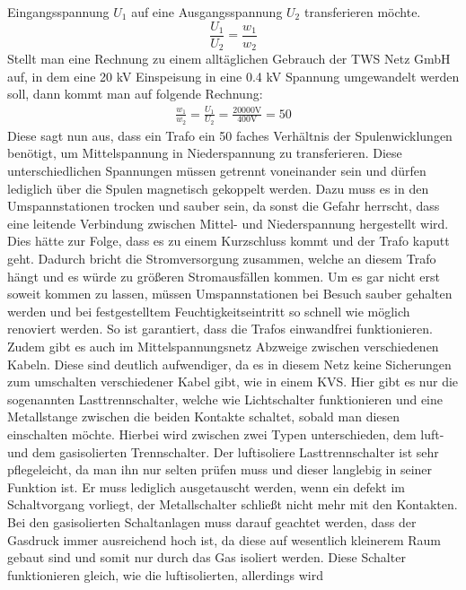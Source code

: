 Eingangsspannung $U_1$ auf eine Ausgangsspannung $U_2$ transferieren möchte. 
\begin{equation}
\frac{U_1}{U_2}=\frac{w_1}{w_2}
\label{eqn:Trafo Wicklungszahl}
\end{equation}
Stellt man eine Rechnung zu einem alltäglichen Gebrauch der TWS Netz GmbH auf, in dem eine 20 kV Einspeisung in eine 0.4 kV Spannung umgewandelt werden 
soll, dann kommt man auf folgende Rechnung:
\begin{eqnarray}
\frac{w_1}{w_2}=\frac{U_1}{U_2}=\frac{20000\text{V}}{400\text{V}}=50
\label{eqn:Beispiel Wicklungen}
\end{eqnarray}
Diese sagt nun aus, dass ein Trafo ein 50 faches Verhältnis der Spulenwicklungen benötigt, um Mittelspannung in Niederspannung zu transferieren. Diese 
unterschiedlichen Spannungen müssen getrennt voneinander sein und dürfen lediglich über die Spulen magnetisch gekoppelt werden. Dazu muss es in den 
Umspannstationen trocken und sauber sein, da sonst die Gefahr herrscht, dass eine leitende Verbindung zwischen Mittel- und Niederspannung hergestellt 
wird. Dies hätte zur Folge, dass es zu einem Kurzschluss kommt und der Trafo kaputt geht. Dadurch bricht die Stromversorgung zusammen, welche an diesem 
Trafo hängt und es würde zu größeren Stromausfällen kommen. Um es gar nicht erst soweit kommen zu lassen, müssen Umspannstationen bei Besuch sauber 
gehalten werden und bei festgestelltem Feuchtigkeitseintritt so schnell wie möglich renoviert werden. So ist garantiert, dass die Trafos einwandfrei 
funktionieren.\\
Zudem gibt es auch im Mittelspannungsnetz Abzweige zwischen verschiedenen Kabeln. Diese sind deutlich aufwendiger, da es in diesem Netz keine Sicherungen 
zum umschalten verschiedener Kabel gibt, wie in einem KVS. Hier gibt es nur die sogenannten Lasttrennschalter, welche wie Lichtschalter funktionieren und
eine Metallstange zwischen die beiden Kontakte schaltet, sobald man diesen einschalten möchte. Hierbei wird zwischen zwei Typen unterschieden, dem luft-
und dem gasisolierten Trennschalter. Der luftisoliere Lasttrennschalter ist sehr pflegeleicht, da man ihn nur selten prüfen muss und dieser langlebig 
in seiner Funktion ist. Er muss lediglich ausgetauscht werden, wenn ein defekt im Schaltvorgang vorliegt, \zB der Metallschalter schließt nicht mehr mit
den Kontakten. Bei den gasisolierten Schaltanlagen muss darauf geachtet werden, dass der Gasdruck immer ausreichend hoch ist, da diese auf wesentlich 
kleinerem Raum gebaut sind und somit nur durch das Gas isoliert werden. Diese Schalter funktionieren gleich, wie die luftisolierten, allerdings wird 
